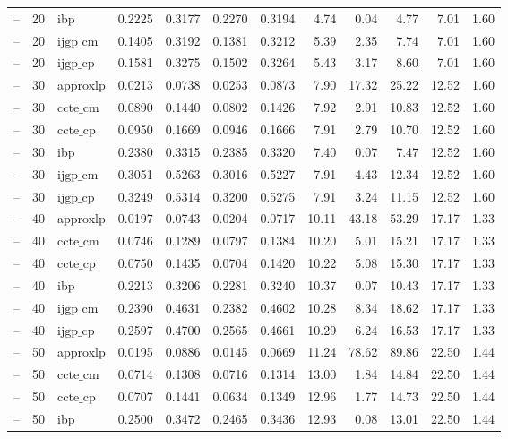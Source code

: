 \begin{table}[ht]
\begin{tabular}{lrlrrrrrrrrr}
-- & 20 & ibp & 0.2225 & 0.3177 & 0.2270 & 0.3194 & 4.74 & 0.04 & 4.77 & 7.01 & 1.60 \\
-- & 20 & $\text{ijgp\_cm}$ & 0.1405 & 0.3192 & 0.1381 & 0.3212 & 5.39 & 2.35 & 7.74 & 7.01 & 1.60 \\
-- & 20 & $\text{ijgp\_cp}$ & 0.1581 & 0.3275 & 0.1502 & 0.3264 & 5.43 & 3.17 & 8.60 & 7.01 & 1.60 \\
-- & 30 & approxlp & 0.0213 & 0.0738 & 0.0253 & 0.0873 & 7.90 & 17.32 & 25.22 & 12.52 & 1.60 \\
-- & 30 & $\text{ccte\_cm}$ & 0.0890 & 0.1440 & 0.0802 & 0.1426 & 7.92 & 2.91 & 10.83 & 12.52 & 1.60 \\
-- & 30 & $\text{ccte\_cp}$ & 0.0950 & 0.1669 & 0.0946 & 0.1666 & 7.91 & 2.79 & 10.70 & 12.52 & 1.60 \\
-- & 30 & ibp & 0.2380 & 0.3315 & 0.2385 & 0.3320 & 7.40 & 0.07 & 7.47 & 12.52 & 1.60 \\
-- & 30 & $\text{ijgp\_cm}$ & 0.3051 & 0.5263 & 0.3016 & 0.5227 & 7.91 & 4.43 & 12.34 & 12.52 & 1.60 \\
-- & 30 & $\text{ijgp\_cp}$ & 0.3249 & 0.5314 & 0.3200 & 0.5275 & 7.91 & 3.24 & 11.15 & 12.52 & 1.60 \\
-- & 40 & approxlp & 0.0197 & 0.0743 & 0.0204 & 0.0717 & 10.11 & 43.18 & 53.29 & 17.17 & 1.33 \\
-- & 40 & $\text{ccte\_cm}$ & 0.0746 & 0.1289 & 0.0797 & 0.1384 & 10.20 & 5.01 & 15.21 & 17.17 & 1.33 \\
-- & 40 & $\text{ccte\_cp}$ & 0.0750 & 0.1435 & 0.0704 & 0.1420 & 10.22 & 5.08 & 15.30 & 17.17 & 1.33 \\
-- & 40 & ibp & 0.2213 & 0.3206 & 0.2281 & 0.3240 & 10.37 & 0.07 & 10.43 & 17.17 & 1.33 \\
-- & 40 & $\text{ijgp\_cm}$ & 0.2390 & 0.4631 & 0.2382 & 0.4602 & 10.28 & 8.34 & 18.62 & 17.17 & 1.33 \\
-- & 40 & $\text{ijgp\_cp}$ & 0.2597 & 0.4700 & 0.2565 & 0.4661 & 10.29 & 6.24 & 16.53 & 17.17 & 1.33 \\
-- & 50 & approxlp & 0.0195 & 0.0886 & 0.0145 & 0.0669 & 11.24 & 78.62 & 89.86 & 22.50 & 1.44 \\
-- & 50 & $\text{ccte\_cm}$ & 0.0714 & 0.1308 & 0.0716 & 0.1314 & 13.00 & 1.84 & 14.84 & 22.50 & 1.44 \\
-- & 50 & $\text{ccte\_cp}$ & 0.0707 & 0.1441 & 0.0634 & 0.1349 & 12.96 & 1.77 & 14.73 & 22.50 & 1.44 \\
-- & 50 & ibp & 0.2500 & 0.3472 & 0.2465 & 0.3436 & 12.93 & 0.08 & 13.01 & 22.50 & 1.44 \\

\end{tabular}
\end{table}
